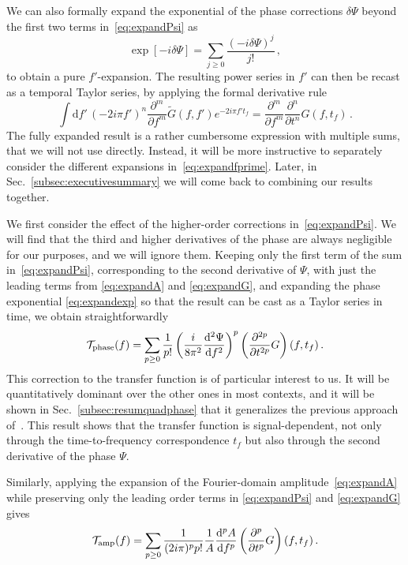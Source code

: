 \documentclass[aps,showpacs,twocolumn,
prd,superscriptaddress,nofootinbib]{revtex4-1}
\newcommand{\be}{\begin{equation}}
\newcommand{\ee}{\end{equation}}
\newcommand\ud{{\mathrm{d}}}
\newcommand\calT{{\mathcal{T}}}
\newcommand{\tf}{t_{f}}
\begin{document}
We can also formally expand the exponential of the phase corrections $\delta \Psi$ beyond the first two terms in~\eqref{eq:expandPsi} as
\be
	\exp\left[ -i\delta\Psi \right] = \sum_{j \geq 0}\frac{(-i\delta\Psi)^j}{j!} \,,
\label{eq:expandexp}
\ee
to obtain a pure $f'$-expansion. The resulting power series in $f'$ can then be recast as a temporal Taylor series, by applying the formal derivative rule
\allowdisplaybreaks
\be
	\int \ud f'\, {(-2i\pi f')}^{n} \frac{\partial^{m}}{\partial f^{m}} \tilde{G}(f,f') e^{-2i\pi f' \tf} = \frac{\partial^{m} }{\partial f^{m}} \frac{\partial^{n} }{\partial t^{n}} G (f,\tf) \,.
\ee
The fully expanded result is a rather cumbersome expression with multiple sums, that we will not use directly. Instead, it will be more instructive to separately consider the different expansions in~\eqref{eq:expandfprime}. Later, in Sec.~\ref{subsec:executivesummary} we will come back to combining our results together.

We first consider the effect of the higher-order corrections in~\eqref{eq:expandPsi}. We will find that the third and higher derivatives of the phase are always negligible for our purposes, and we will ignore them. Keeping only the first term of the sum in~\eqref{eq:expandPsi}, corresponding to the second derivative of $\Psi$, with just the leading terms from \eqref{eq:expandA} and \eqref{eq:expandG}, and expanding the phase exponential \eqref{eq:expandexp} so that the result can be cast as a Taylor series in time, we obtain straightforwardly
\be\label{eq:resulttaylorPsi}
	\calT_{\rm phase}(f) = \sum\limits_{p\geq 0} \frac{1}{p!} \left( \frac{i}{8\pi^{2}}\frac{\ud^{2} \Psi}{\ud f^{2}} \right)^{p} \left( \frac{\partial^{2p} }{\partial t^{2p}} G \right)(f, \tf) \,.
\ee
This correction to the transfer function is of particular interest to us. It will be quantitatively dominant over the other ones in most contexts, and it will be shown in Sec.~\ref{subsec:resumquadphase} that it generalizes the previous approach of~\cite{KCY14}. This result shows that the transfer function is signal-dependent, not only through the time-to-frequency correspondence $t_{f}$ but also through the second derivative of the phase $\Psi$.

Similarly, applying the expansion of the Fourier-domain amplitude~\eqref{eq:expandA} while preserving only the leading order terms in \eqref{eq:expandPsi} and \eqref{eq:expandG} gives
\be\label{eq:resulttaylorA}
	\calT_{\rm amp}(f) = \sum\limits_{p\geq 0} \frac{1}{(2i\pi)^{p}p!} \frac{1}{A} \frac{\ud^{p} A}{\ud f ^{p}}  \left( \frac{\partial^{p} }{\partial t^{p}} G \right)(f,\tf) \,.
\ee
\end{document}
